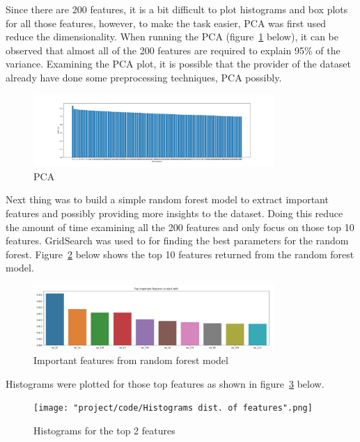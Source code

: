 \documentclass[journal,twoside,web]{ieeecolor}
\begin{document}
Since there are 200 features, it is a bit difficult to plot histograms and box plots for all those features, however, to make the task easier, PCA was first used reduce the dimensionality. When running the PCA (figure~\ref{fig:fig2} below), it can be observed that almost all of the 200 features are required to explain 95\% of the variance. Examining the PCA plot, it is possible that the provider of the dataset already have done some preprocessing techniques, PCA possibly. 
\begin{figure}[h!]
  \centering
  \includegraphics[width=3.6in]{project/code/1-pcafeatures.png}
  \caption{PCA}
  \label{fig:fig2}
\end{figure}
Next thing was to build a simple random forest model to extract important features and possibly providing more insights to the dataset. Doing this reduce the amount of time examining all the 200 features and only focus on those top 10 features. GridSearch was used to for finding the best parameters for the random forest. Figure~\ref{fig:fig3} below shows the top 10 features returned from the random forest model. 
\begin{figure}[h!]
  \centering
  \includegraphics[width=3.6in]{project/code/important features.png}
  \caption{Important features from random forest model}
  \label{fig:fig3}
\end{figure}

Histograms were plotted for those top features as shown in figure~\ref{fig:fig4} below.

\begin{figure}[h!]
  \centering
  \texttt{[image: "project/code/Histograms dist. of features".png]}
  \caption{Histograms for the top 2 features}
  \label{fig:fig4}
\end{figure}
\end{document}
